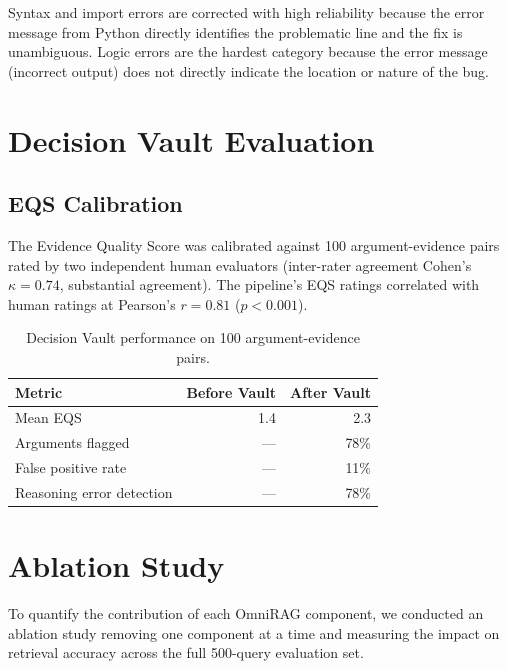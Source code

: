 Syntax and import errors are corrected with high reliability because the error message from Python directly identifies the problematic line and the fix is unambiguous. Logic errors are the hardest category because the error message (incorrect output) does not directly indicate the location or nature of the bug.

\section{Decision Vault Evaluation}
\label{sec:vault-results}

\subsection{EQS Calibration}
\label{subsec:eqs-calibration}

The Evidence Quality Score was calibrated against 100 argument-evidence pairs rated by two independent human evaluators (inter-rater agreement Cohen's $\kappa = 0.74$, substantial agreement). The pipeline's EQS ratings correlated with human ratings at Pearson's $r = 0.81$ ($p < 0.001$).

\begin{table}[ht]
    \centering
    \caption{Decision Vault performance on 100 argument-evidence pairs.}
    \label{tab:vault-results}
    \renewcommand{\arraystretch}{1.3}
    \begin{tabular}{lrr}
        \toprule
        \textbf{Metric} & \textbf{Before Vault} & \textbf{After Vault} \\
        \midrule
        Mean EQS            & 1.4 & 2.3 \\
        Arguments flagged   & ---  & 78\% \\
        False positive rate & ---  & 11\% \\
        Reasoning error detection & --- & 78\% \\
        \bottomrule
    \end{tabular}
\end{table}

\section{Ablation Study}
\label{sec:ablation}

To quantify the contribution of each OmniRAG component, we conducted an ablation study removing one component at a time and measuring the impact on retrieval accuracy across the full 500-query evaluation set.

